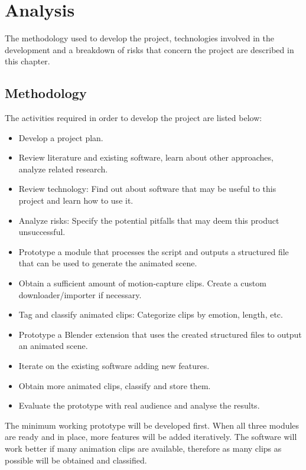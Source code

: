 \chapter{Analysis \label{chap:analysis}}

The methodology used to develop the project, technologies involved in the development and a breakdown of risks that concern the project are described in this chapter.


\section{Methodology}

The activities required in order to develop the project are listed below:

\begin{itemize}
\item Develop a project plan.
\item Review literature and existing software, learn about other approaches, analyze related research.
\item Review technology: Find out about software that may be useful to this project and learn how to use it.
\item Analyze risks: Specify the potential pitfalls that may deem this product unsuccessful.
\item Prototype a module that processes the script and outputs a structured file that can be used to generate the animated scene.
\item Obtain a sufficient amount of motion-capture clips. Create a custom downloader/importer if necessary.
\item Tag and classify animated clips: Categorize clips by emotion, length, etc.
\item Prototype a Blender extension that uses the created structured files to output an animated scene.
\item Iterate on the existing software adding new features.
\item Obtain more animated clips, classify and store them.
\item Evaluate the prototype with real audience and analyse the results.
\end{itemize}

The minimum working prototype will be developed first. When all three modules are ready and in place, more features will be added iteratively. The software will work better if many animation clips are available, therefore as many clips as possible will be obtained and classified.

